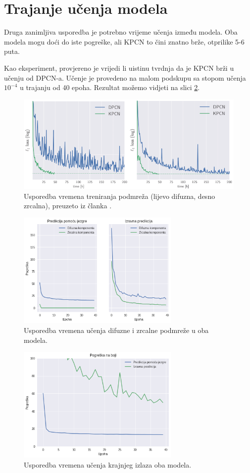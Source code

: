 \documentclass[times, utf8, seminar, numeric]{fer}
\begin{document}
\section{Trajanje učenja modela}
Druga zanimljiva usporedba je potrebno vrijeme učenja između modela. Oba modela mogu doći do iste
pogreške, ali KPCN to čini znatno brže, otprilike 5-6 puta.

Kao eksperiment, provjereno je vrijedi li uistinu tvrdnja da je KPCN brži u učenju od DPCN-a.
Učenje je provedeno na malom podskupu sa stopom učenja $10^{-4}$ u trajanju od 40 epoha.
Rezultat možemo vidjeti na slici \ref{fig:time}.
\begin{figure}[H]
\centering
\includegraphics[width=\textwidth]{time.png}
\caption{Usporedba vremena treniranja podmreža (lijevo difuzna, desno zrcalna), preuzeto iz članka
  \cite{Bako2017KPCN}.}
\label{fig:time-paper}
\end{figure}
\begin{figure}[H]
\centering
\includegraphics[width=0.7\textwidth]{time_my.png}
\caption{Usporedba vremena učenja difuzne i zrcalne podmreže u oba modela.}
\label{fig:time}
\end{figure}
\begin{figure}[H]
\centering
\includegraphics[width=0.7\textwidth]{model_time.png}
\caption{Usporedba vremena učenja krajnjeg izlaza oba modela.}
\label{fig:model-time}
\end{figure}
\end{document}
